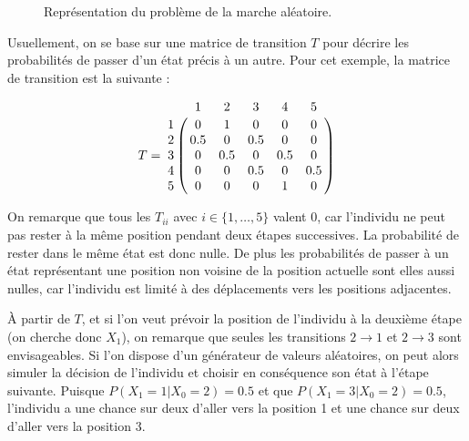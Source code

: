 \documentclass[12pt]{article}
\begin{document}
\begin{figure}[H]
\centering


\caption{Représentation du problème de la marche aléatoire.}

\end{figure}

Usuellement, on se base sur une matrice de transition $T$ pour décrire
les probabilités de passer d'un état précis à un autre. Pour cet
exemple, la matrice de transition est la suivante :

$$
T = \bordermatrix{
    & 1 & 2 & 3 & 4 & 5 \cr
  1 & 0 & 1 & 0 & 0 & 0 \cr
  2 & 0.5 & 0 & 0.5 & 0 & 0 \cr
  3 & 0 & 0.5 & 0 & 0.5 & 0 \cr
  4 & 0 & 0 & 0.5 & 0 & 0.5 \cr
  5 & 0 & 0 & 0 & 1 & 0 \cr
}
$$
\vspace{0.5cm}

On remarque que tous les $T_{ii}$ avec $i \in \{1, \dots, 5\}$ valent
0, car l'individu ne peut pas rester à la même position pendant deux
étapes successives. La probabilité de rester dans le même état est
donc nulle. De plus les probabilités de passer à un état représentant
une position non voisine de la position actuelle sont elles aussi
nulles, car l'individu est limité à des déplacements vers les
positions adjacentes.

\`A partir de $T$, et si l'on veut prévoir la position de l'individu à
la deuxième étape (on cherche donc $X_1$), on remarque que seules les
transitions $2 \rightarrow 1$ et $2 \rightarrow 3$ sont
envisageables. Si l'on dispose d'un générateur de valeurs aléatoires,
on peut alors simuler la décision de l'individu et choisir en
conséquence son état à l'étape suivante. Puisque $P(X_1 = 1 | X_0 = 2)
= 0.5$ et que $P(X_1 = 3 | X_0 = 2) = 0.5$, l'individu a une chance
sur deux d'aller vers la position 1 et une chance sur deux d'aller
vers la position 3.
\end{document}
